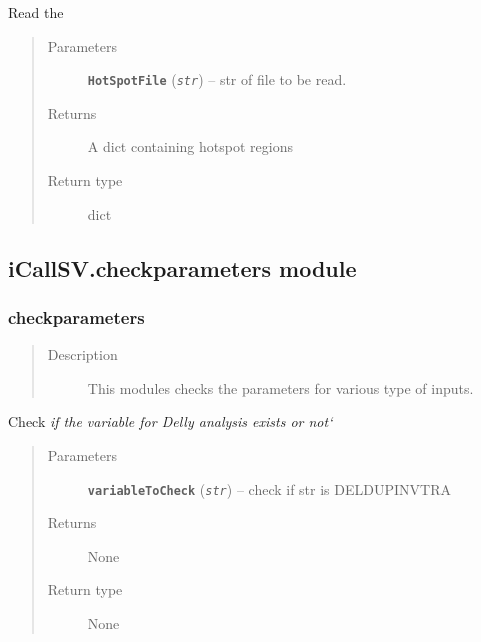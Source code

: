 \documentclass[letterpaper,10pt,english]{sphinxmanual}
\begin{document}
\begin{fulllineitems}
\label{iCallSV:iCallSV.checkHotSpotList.ReadHotSpotFile}
Read the 
\begin{quote}\begin{description}
\item[{Parameters}] \leavevmode
\textbf{\texttt{HotSpotFile}} (\emph{\texttt{str}}) -- str of file to be read.

\item[{Returns}] \leavevmode
A dict containing hotspot regions

\item[{Return type}] \leavevmode
dict

\end{description}\end{quote}

\end{fulllineitems}



\subsection{iCallSV.checkparameters module}
\label{iCallSV:icallsv-checkparameters-module}\label{iCallSV:module-iCallSV.checkparameters}

\subsubsection{checkparameters}
\label{iCallSV:checkparameters}\begin{quote}\begin{description}
\item[{Description}] \leavevmode
This modules checks the parameters for various type of inputs.

\end{description}\end{quote}

\begin{fulllineitems}
\label{iCallSV:iCallSV.checkparameters.checkDellyAnalysisType}
Check \emph{if the variable for Delly analysis exists or not{}`}
\begin{quote}\begin{description}
\item[{Parameters}] \leavevmode
\textbf{\texttt{variableToCheck}} (\emph{\texttt{str}}) -- check if str is DEL\textbar{}DUP\textbar{}INV\textbar{}TRA

\item[{Returns}] \leavevmode
None

\item[{Return type}] \leavevmode
None

\end{description}\end{quote}

\end{fulllineitems}
\end{document}
